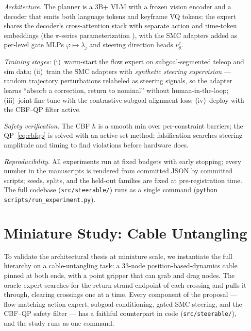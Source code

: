 \documentclass[11pt,a4paper]{article}
\begin{document}
\emph{Architecture.} The planner is a 3B+ VLM with a frozen vision encoder and a
decoder that emits both language tokens and keyframe VQ tokens; the expert shares
the decoder's cross-attention stack with separate action and time-token embeddings
(the $\pi$-series parameterization \cite{pi0}), with the SMC adapters added as
per-level gate MLPs $\varphi \mapsto \lambda_j$ and steering direction heads
$v_\theta^{j}$.

\emph{Training stages:} (i)~warm-start the flow expert on subgoal-segmented
teleop and sim data; (ii)~train the SMC adapters with \emph{synthetic steering
supervision} --- random trajectory perturbations relabeled as steering signals,
so the adapter learns ``absorb a correction, return to nominal'' without
human-in-the-loop; (iii)~joint fine-tune with the contrastive subgoal-alignment
loss; (iv)~deploy with the CBF--QP filter active.

\emph{Safety verification.} The CBF $h$ is a smooth min over per-constraint
barriers; the QP~\eqref{eq:cbfqp} is solved with an active-set method;
falsification searches steering amplitude and timing to find violations before
hardware does.

\emph{Reproducibility.} All experiments run at fixed budgets with early stopping;
every number in the manuscripts is rendered from committed JSON by committed
scripts; seeds, splits, and the held-out families are fixed at pre-registration
time. The full codebase (\texttt{src/steerable/}) runs as a single command
(\texttt{python scripts/run\_experiment.py}).

\section{Miniature Study: Cable Untangling}
\label{sec:results}

To validate the architectural thesis at miniature scale, we instantiate the
full hierarchy on a cable-untangling task: a 33-node position-based-dynamics
cable pinned at both ends, with a point gripper that can grab and drag nodes.
The oracle expert searches for the return-strand endpoint of each crossing and
pulls it through, clearing crossings one at a time. Every component of the
proposal --- flow-matching action expert, subgoal conditioning, gated SMC
steering, and the CBF--QP safety filter --- has a faithful counterpart in code
(\texttt{src/steerable/}), and the study runs as one command.
\end{document}
